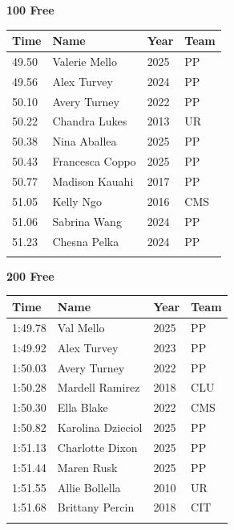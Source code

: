 \noindent\begin{minipage}[t]{0.98\textwidth}
\centering
\textbf{\textcolor{teamprimary}{100 Free}}\par
\vspace{0.5em}
\centering
\small
\renewcommand{\arraystretch}{1.0}
\setlength{\tabcolsep}{4pt}
\begin{tabular}{@{}p{2.5cm}p{4.5cm}p{1.5cm}p{2.5cm}@{}}
\toprule
\textbf{Time} & \textbf{Name} & \textbf{Year} & \textbf{Team} \\
\midrule
49.50 & Valerie Mello & 2025 & PP \\
49.56 & Alex Turvey & 2024 & PP \\
50.10 & Avery Turney & 2022 & PP \\
50.22 & Chandra Lukes & 2013 & UR \\
50.38 & Nina Aballea & 2025 & PP \\
50.43 & Francesca Coppo & 2025 & PP \\
50.77 & Madison Kauahi & 2017 & PP \\
51.05 & Kelly Ngo & 2016 & CMS \\
51.06 & Sabrina Wang & 2024 & PP \\
51.23 & Chesna Pelka & 2024 & PP \\
\bottomrule
\vspace{0.5em}
\end{tabular}
\end{minipage}
\vspace{1.2em}
\noindent\begin{minipage}[t]{0.98\textwidth}
\centering
\textbf{\textcolor{teamprimary}{200 Free}}\par
\vspace{0.5em}
\centering
\small
\renewcommand{\arraystretch}{1.0}
\setlength{\tabcolsep}{4pt}
\begin{tabular}{@{}p{2.5cm}p{4.5cm}p{1.5cm}p{2.5cm}@{}}
\toprule
\textbf{Time} & \textbf{Name} & \textbf{Year} & \textbf{Team} \\
\midrule
1:49.78 & Val Mello & 2025 & PP \\
1:49.92 & Alex Turvey & 2023 & PP \\
1:50.03 & Avery Turney & 2022 & PP \\
1:50.28 & Mardell Ramirez & 2018 & CLU \\
1:50.30 & Ella Blake & 2022 & CMS \\
1:50.82 & Karolina Dzieciol & 2025 & PP \\
1:51.13 & Charlotte Dixon & 2025 & PP \\
1:51.44 & Maren Rusk & 2025 & PP \\
1:51.55 & Allie Bollella & 2010 & UR \\
1:51.68 & Brittany Percin & 2018 & CIT \\
\bottomrule
\vspace{0.5em}
\end{tabular}
\end{minipage}
